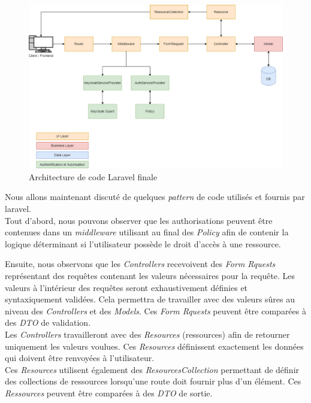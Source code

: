 \documentclass[
    iai, %
    il, %
]{heig-tb}
\begin{document}
\begin{center}
    \begin{figure}[H]
        \includegraphics[width=\textwidth]{./assets/figures/architecture-code-finale.drawio.png}
        \caption{Architecture de code Laravel finale \label{architecture-code-finale}}
    \end{figure}
\end{center}

Nous allons maintenant discuté de quelques \emph{pattern} de code utilisés et fournis par \Gls{laravel}.\\
Tout d'abord, nous pouvons observer que les authorisations peuvent être contenues dans un \emph{middleware} utilisant au final des \emph{Policy} afin de contenir la logique déterminant si l'utilisateur possède le droit d'accès à une ressource.

Ensuite, nous observons que les \emph{Controllers} recevoivent des \emph{Form Rquests} représentant des requêtes contenant les valeurs nécessaires pour la requête. Les valeurs à l'intérieur des requêtes seront exhaustivement définies et syntaxiquement validées. Cela permettra de travailler avec des valeurs sûres au niveau des \emph{Controllers} et des \emph{Models}. Ces \emph{Form Rquests} peuvent être comparées à des \emph{DTO} de validation. \\

Les \emph{Controllers} travailleront avec des \emph{Resources} (ressources) afin de retourner uniquement les valeurs voulues. Ces \emph{Resources} définissent exactement les données qui doivent être renvoyées à l'utilisateur. \\
Ces \emph{Resources} utilisent également des \emph{ResourcesCollection} permettant de
définir des collections de ressources lorsqu'une route doit fournir plus d'un élément.
Ces \emph{Ressources} peuvent être comparées à des \emph{DTO} de sortie.
\end{document}
